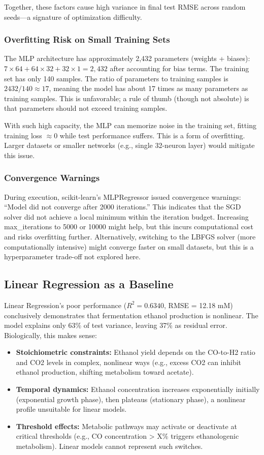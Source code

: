 \documentclass[conference]{IEEEtran}
\begin{document}
Together, these factors cause high variance in final test RMSE across random seeds—a signature of optimization difficulty.

\subsubsection{Overfitting Risk on Small Training Sets}
The MLP architecture has approximately 2,432 parameters (weights + biases): $7 \times 64 + 64 \times 32 + 32 \times 1 = 2,432$ after accounting for bias terms. The training set has only 140 samples. The ratio of parameters to training samples is $2432 / 140 \approx 17$, meaning the model has about 17 times as many parameters as training samples. This is unfavorable; a rule of thumb (though not absolute) is that parameters should not exceed training samples.

With such high capacity, the MLP can memorize noise in the training set, fitting training loss $\approx 0$ while test performance suffers. This is a form of overfitting. Larger datasets or smaller networks (e.g., single 32-neuron layer) would mitigate this issue.

\subsubsection{Convergence Warnings}
During execution, scikit-learn's MLPRegressor issued convergence warnings: ``Model did not converge after 2000 iterations.'' This indicates that the SGD solver did not achieve a local minimum within the iteration budget. Increasing max\_iterations to 5000 or 10000 might help, but this incurs computational cost and risks overfitting further. Alternatively, switching to the LBFGS solver (more computationally intensive) might converge faster on small datasets, but this is a hyperparameter trade-off not explored here.

\subsection{Linear Regression as a Baseline}
Linear Regression's poor performance ($R^2 = 0.6340$, RMSE = 12.18 mM) conclusively demonstrates that fermentation ethanol production is nonlinear. The model explains only 63\% of test variance, leaving 37\% as residual error. Biologically, this makes sense:

\begin{itemize}
\item \textbf{Stoichiometric constraints:} Ethanol yield depends on the CO-to-H2 ratio and CO2 levels in complex, nonlinear ways (e.g., excess CO2 can inhibit ethanol production, shifting metabolism toward acetate).
\item \textbf{Temporal dynamics:} Ethanol concentration increases exponentially initially (exponential growth phase), then plateaus (stationary phase), a nonlinear profile unsuitable for linear models.
\item \textbf{Threshold effects:} Metabolic pathways may activate or deactivate at critical thresholds (e.g., CO concentration > X\% triggers ethanologenic metabolism). Linear models cannot represent such switches.
\end{itemize}
\end{document}
